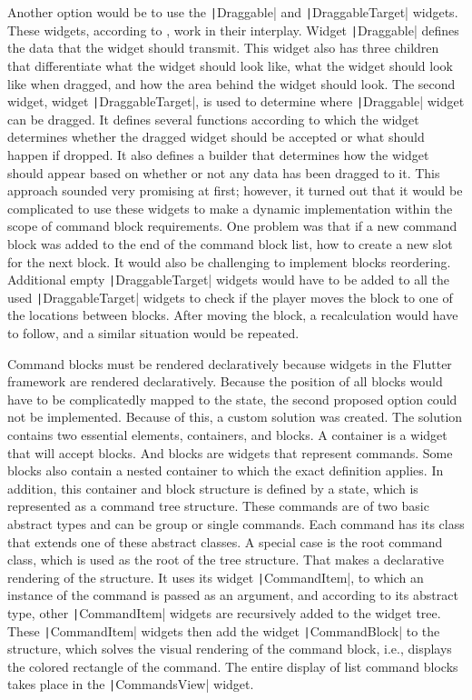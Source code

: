 Another option would be to use the \texttt|Draggable| and \texttt|DraggableTarget| widgets.
These widgets, according to \cite{a2022_material}, work in their interplay.
Widget \texttt|Draggable| defines the data that the widget should transmit.
This widget also has three children that differentiate what the widget should look like, what the widget should look like when dragged, and how the area behind the widget should look.
The second widget, widget \texttt|DraggableTarget|, is used to determine where \texttt|Draggable| widget can be dragged.
It defines several functions according to which the widget determines whether the dragged widget should be accepted or what should happen if dropped.
It also defines a builder that determines how the widget should appear based on whether or not any data has been dragged to it.
This approach sounded very promising at first; however, it turned out that it would be complicated to use these widgets to make a dynamic implementation within the scope of command block requirements.
One problem was that if a new command block was added to the end of the command block list, how to create a new slot for the next block.
It would also be challenging to implement blocks reordering.
Additional empty \texttt|DraggableTarget| widgets would have to be added to all the used \texttt|DraggableTarget| widgets to check if the player moves the block to one of the locations between blocks.
After moving the block, a recalculation would have to follow, and a similar situation would be repeated.

Command blocks must be rendered declaratively because widgets in the Flutter framework are rendered declaratively.
Because the position of all blocks would have to be complicatedly mapped to the state, the second proposed option could not be implemented.
Because of this, a custom solution was created.
The solution contains two essential elements, containers, and blocks.
A container is a widget that will accept blocks.
And blocks are widgets that represent commands.
Some blocks also contain a nested container to which the exact definition applies.
In addition, this container and block structure is defined by a state, which is represented as a command tree structure.
These commands are of two basic abstract types and can be group or single commands.
Each command has its class that extends one of these abstract classes.
A special case is the root command class, which is used as the root of the tree structure.
That makes a declarative rendering of the structure.
It uses its widget \texttt|CommandItem|, to which an instance of the command is passed as an argument, and according to its abstract type, other \texttt|CommandItem| widgets are recursively added to the widget tree.
These \texttt|CommandItem| widgets then add the widget \texttt|CommandBlock| to the structure, which solves the visual rendering of the command block, i.e., displays the colored rectangle of the command.
The entire display of list command blocks takes place in the \texttt|CommandsView| widget.

